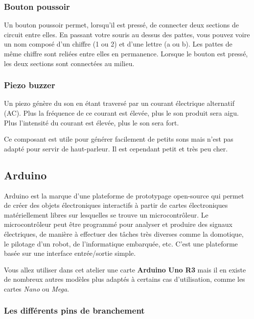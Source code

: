 \subsubsection{Bouton poussoir}

Un bouton poussoir permet, lorsqu'il est pressé, de connecter deux sections de circuit entre elles.
En passant votre souris au dessus des pattes, vous pouvez voire un nom composé d'un chiffre (1 ou 2) et d'une lettre (a ou b).
Les pattes de même chiffre sont reliées entre elles en permanence.
Lorsque le bouton est pressé, les deux sections sont connectées au milieu.


\subsubsection{Piezo buzzer}

Un piezo génère du son en étant traversé par un courant électrique alternatif (AC).
Plus la fréquence de ce courant est élevée, plus le son produit sera aigu.
Plus l'intensité du courant est élevée, plus le son sera fort.

Ce composant est utile pour générer facilement de petits sons mais n'est pas adapté pour servir de haut-parleur.
Il est cependant petit et très peu cher.



\clearpage
\subsection{Arduino}

Arduino est la marque d'une plateforme de prototypage open-source qui permet de créer des objets électroniques interactifs à partir de cartes électroniques matériellement libres sur lesquelles se trouve un microcontrôleur.
Le microcontrôleur peut être programmé pour analyser et produire des signaux électriques, de manière à effectuer des tâches très diverses comme la domotique, le pilotage d'un robot, de l'informatique embarquée, etc.
C'est une plateforme basée sur une interface entrée/sortie simple.

Vous allez utiliser dans cet atelier une carte \textbf{Arduino Uno R3} mais il en existe de nombreux autres modèles plus adaptés à certains cas d'utilisation, comme les cartes \textit{Nano} ou \textit{Mega}.

\subsubsection{Les différents pins de branchement}

